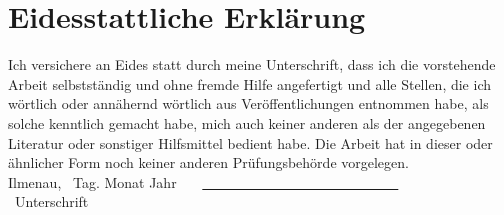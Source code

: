 \documentclass[main.tex]{subfiles}
\begin{document}
\renewcommand\refname{Eidesstattliche Erklärung} \section*{Eidesstattliche Erklärung}


\vspace*{5em}
\normalsize
Ich versichere an Eides statt durch meine Unterschrift, dass ich die vorstehende Arbeit selbstständig und ohne fremde Hilfe angefertigt und alle Stellen, die ich wörtlich oder annähernd wörtlich aus Veröffentlichungen entnommen habe, als solche kenntlich gemacht habe, mich auch keiner anderen als der angegebenen Literatur oder sonstiger Hilfsmittel bedient habe. Die Arbeit hat in dieser oder ähnlicher Form noch keiner anderen Prüfungsbehörde vorgelegen.
  \vspace*{5em}
\\
Ilmenau, \ Tag. Monat Jahr \ \ \ \underline{\ \ \ \ \ \ \ \ \ \ \ \ \ \ \ \ \ \
     \ \ \ \ \ \ \ \ \ \ }\\
\hspace*{12.6em}\small{\ Unterschrift}
\end{document}
